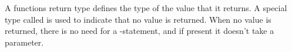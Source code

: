 A functions return type defines the type of the value that it returns. A special type called  is used to indicate that no value is returned. When no value is returned, there is no need for a -statement, and if present it doesn't take a parameter.
